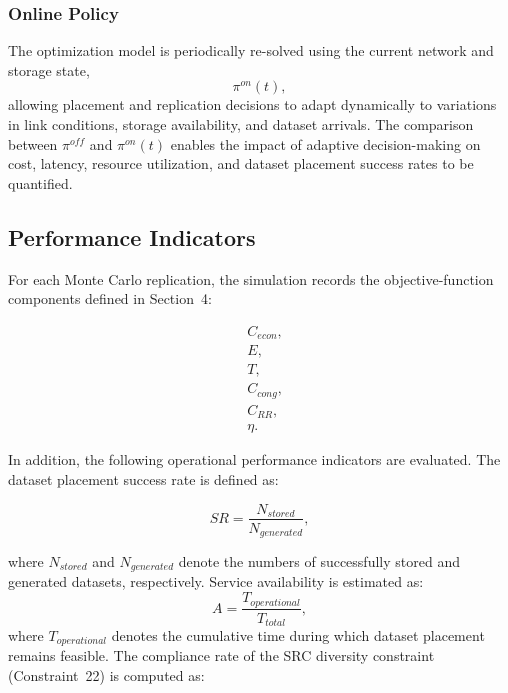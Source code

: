 \documentclass[a4paper,fleqn]{cas-dc}
\begin{document}
\subsubsection*{Online Policy} 

The optimization model is periodically re-solved using the current network and storage state, \begin{equation} \nonumber \pi^{on}(t), \end{equation} allowing placement and replication decisions to adapt dynamically to variations in link conditions, storage availability, and dataset arrivals. The comparison between \(\pi^{off}\) and \(\pi^{on}(t)\) enables the impact of adaptive decision-making on cost, latency, resource utilization, and dataset placement success rates to be quantified.

\subsection*{Performance Indicators} 

For each Monte Carlo replication, the simulation records the objective-function components defined in Section~4: 

\begin{align} &\nonumber C_{econ},\\ &\nonumber E,\\ &\nonumber T,\\ &\nonumber C_{cong},\\ &\nonumber C_{RR},\\ &\nonumber \eta. 
\end{align} 

In addition, the following operational performance indicators are evaluated. The dataset placement success rate is defined as:

\begin{equation} 
SR = \frac{N_{stored}} {N_{generated}}, 
\end{equation} 

where \(N_{stored}\) and \(N_{generated}\) denote the numbers of successfully stored and generated datasets, respectively. Service availability is estimated as: 
\begin{equation} A = \frac{T_{operational}} {T_{total}}, 
\end{equation} 
where \(T_{operational}\) denotes the cumulative time during which dataset placement remains feasible. The compliance rate of the SRC diversity constraint (Constraint~22) is computed as:
\end{document}
